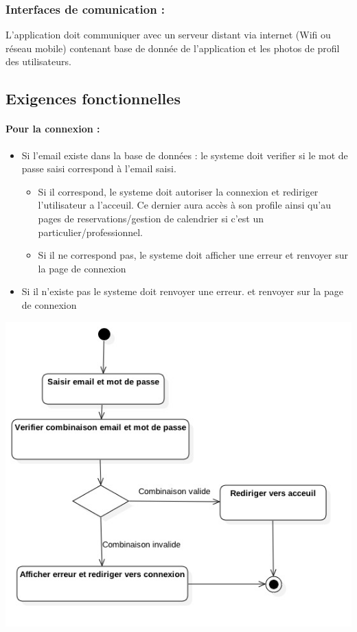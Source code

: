 \documentclass{article}
\begin{document}
\subsubsection{Interfaces de comunication :}
L'application doit communiquer avec un serveur distant via internet
(Wifi ou réseau mobile) contenant base de donnée de l'application et
les photos de profil des utilisateurs.


\subsection{Exigences fonctionnelles}
\paragraph{Pour la connexion : }

\begin{itemize}
\item Si l'email existe dans la base de données : 
	le systeme doit verifier si le mot de passe saisi
	correspond à l'email saisi.
		\begin{itemize}
		\item Si il correspond, le systeme doit autoriser la connexion et
			rediriger l'utilisateur a l'acceuil. Ce dernier aura accès à son
			profile ainsi qu'au pages de reservations/gestion de calendrier
			si c'est un particulier/professionnel.
		\item Si il ne correspond pas, le systeme doit afficher une erreur
			et renvoyer sur la page de connexion
		\end{itemize}
\item Si il n'existe pas le systeme doit renvoyer une erreur.
	et renvoyer sur la page de connexion
\end{itemize}

\includegraphics[scale=0.6]{ShematDiagrammes/activiteConnexion.jpg}
\end{document}
